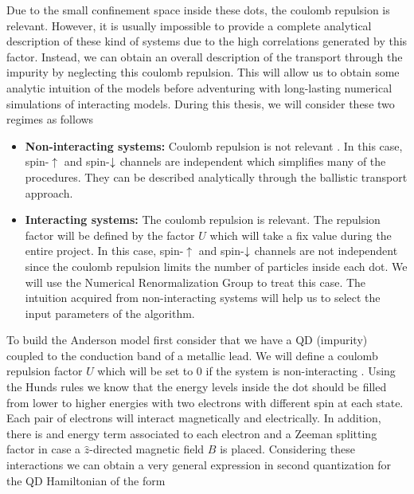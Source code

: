  Due to the small confinement space inside these dots, the coulomb repulsion is relevant. However, it is usually impossible to provide a complete analytical description of these kind of systems due to the high correlations generated by this factor. Instead, we can obtain an overall description of the transport through the impurity by neglecting this coulomb repulsion. This will allow us to obtain some analytic intuition of the models  before adventuring with long-lasting numerical simulations of interacting models. During this thesis, we will consider these two regimes as follows
\begin{itemize}
    \item \textbf{Non-interacting systems:} Coulomb repulsion is not relevant . In this case, spin-$\uparrow$ and spin-$\downarrow$ channels are independent which simplifies many of the procedures. They can be described analytically through the ballistic transport approach. 

    \item \textbf{Interacting systems:} The coulomb repulsion is relevant. The repulsion factor will be defined by the factor $U$ which will take a fix value during the entire project. In this case, spin-$\uparrow$ and spin-$\downarrow$ channels are not independent since the coulomb repulsion limits the number of particles inside each dot. We will use the Numerical Renormalization Group to treat this case. The intuition acquired from non-interacting systems will help us to select the input parameters of the algorithm.  
\end{itemize}



To build the Anderson model first consider that we have a QD (impurity) coupled to the conduction band of a metallic lead. We will define a coulomb repulsion factor $U$ which will be set to $0$ if the system is non-interacting . Using the Hunds rules we know that the energy levels inside the dot should be filled from lower to higher energies with two electrons with different spin at each state. Each pair of electrons will interact magnetically and electrically. In addition, there is and energy term associated to each electron and a Zeeman splitting factor in case a $\hat{z}$-directed magnetic field $B$ is placed.  Considering these interactions we can obtain a very general expression in second quantization for the QD Hamiltonian
of the form \citep[(3.2)]{sindel_numerical_2005}

